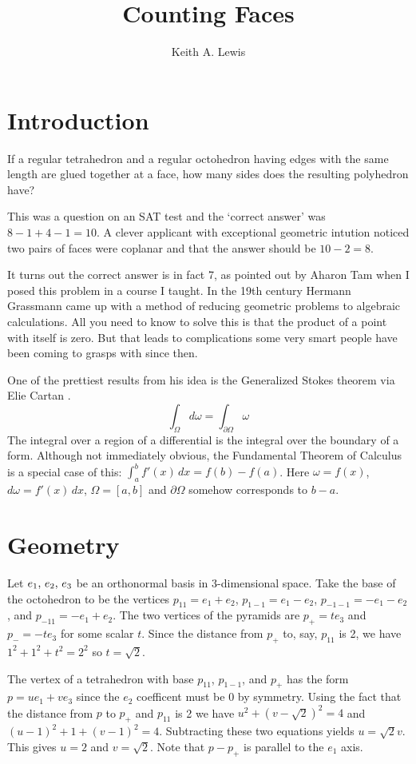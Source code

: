 \documentclass[11pt,fleqn]{article}
\title{Counting Faces}
\author{Keith A. Lewis}
\begin{document}
\maketitle

\section{Introduction}
If a regular tetrahedron and a regular octohedron having edges
with the same length are glued together at a face, how many sides
does the resulting polyhedron have?

This was a question on an SAT test and the `correct answer' was
$8 - 1 + 4 - 1 = 10$. A clever applicant with exceptional geometric
intution noticed two pairs of faces were coplanar and that the
answer should be $10 - 2 = 8$. 

It turns out the correct answer is in fact 7, as pointed out by Aharon
Tam when I posed this problem in a course I taught.  In the 19th century
Hermann Grassmann came up with a method of reducing geometric problems
to algebraic calculations. All you need to know to solve this is that
the product of a point with itself is zero. But that leads to 
complications some very smart people have been coming to grasps with
since then.

One of the prettiest results from his idea is the Generalized Stokes theorem
via Elie Cartan \cite{Car???}.
\[
\int_\Omega d\omega = \int_{\partial\Omega} \omega
\]
The integral over a region of a differential is the integral
over the boundary of a form. Although not immediately obvious,
the Fundamental Theorem of Calculus is a special case of
this: \(\int_a^b f'(x)\,dx = f(b) - f(a)\). Here
\(\omega = f(x)\), \(d\omega = f'(x)\,dx\), \(\Omega = [a, b]\)
and \(\partial\Omega\) somehow corresponds to \(b - a\).

\section{Geometry}
Let \(e_1$, $e_2$, $e_3\) be an orthonormal basis in 3-dimensional space.
Take the base of the octohedron to be the vertices \(p_{11} = e_1 + e_2\),
$p_{1-1} = e_1 - e_2$, $p_{-1-1} = -e_1 - e_2$, and $p_{-11} = -e_1 + e_2$.
The two vertices of the pyramids are $p_+ = t e_3$ and $p_- = -te_3$
for some scalar $t$. Since the distance from $p_+$ to, say, $p_{11}$
is 2, we have $1^2 + 1^2 + t^2 = 2^2$ so $t = \sqrt{2}$.

The vertex of a tetrahedron with base $p_{11}$, $p_{1-1}$, and $p_+$
has the form $p = u e_1 + v e_3$ since the $e_2$ coefficent must be 0 by
symmetry. Using the fact that the distance from $p$ to $p_+$ and $p_{11}$
is 2 we have $u^2 + (v - \sqrt{2})^2 = 4$ and $(u - 1)^2 + 1 + (v -
1)^2 = 4$. Subtracting these two equations yields $u = \sqrt{2}v$. This
gives $u = 2$ and $v = \sqrt{2}$. Note
that \(p - p_+\) is parallel to the \(e_1\) axis.
\end{document}
